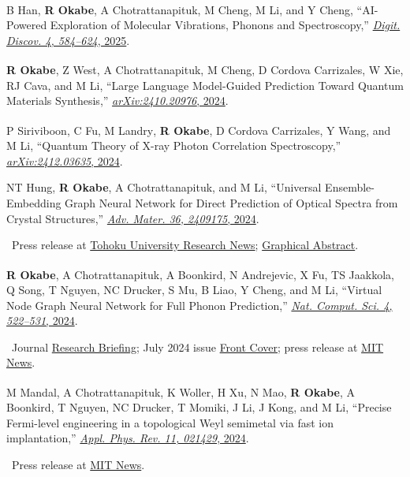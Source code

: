 \documentclass[10pt,a4paper]{article}
\newcommand{\note}[1]{\par{\hspace{1.2em}\textbullet\ #1}}
\newcommand{\cofirst}{\textsuperscript{\dag}}
\newcommand{\me}{\textbf{R Okabe}}
\begin{document}
\begin{cvenum}
  \item B Han\cofirst, \me\cofirst, A Chotrattanapituk\cofirst, M Cheng\cofirst, M Li, and Y Cheng, ``AI-Powered Exploration of Molecular Vibrations, Phonons and Spectroscopy,'' \href{https://doi.org/10.1039/D4DD00353E}{\textit{Digit. Discov. 4, 584--624}, 2025}.
  \item \me\cofirst, Z West\cofirst, A Chotrattanapituk, M Cheng, D Cordova Carrizales, W Xie, RJ Cava, and M Li, ``Large Language Model-Guided Prediction Toward Quantum Materials Synthesis,'' \href{https://arxiv.org/abs/2410.20976}{\textit{arXiv:2410.20976}, 2024}.
  \item P Siriviboon\cofirst, C Fu\cofirst, M Landry\cofirst, \me, D Cordova Carrizales, Y Wang, and M Li, ``Quantum Theory of X-ray Photon Correlation Spectroscopy,'' \href{https://arxiv.org/abs/2412.03635}{\textit{arXiv:2412.03635}, 2024}.
  \item NT Hung, \me, A Chotrattanapituk, and M Li, ``Universal Ensemble-Embedding Graph Neural Network for Direct Prediction of Optical Spectra from Crystal Structures,'' \href{https://doi.org/10.1002/adma.202409175}{\textit{Adv. Mater. 36, 2409175}, 2024}.
    \note{Press release at \href{https://www.tohoku.ac.jp/en/press/ai_speeds_up_discovery_of_energy_and_quantum_materials.html}{Tohoku University Research News}; \href{https://onlinelibrary.wiley.com/doi/10.1002/adma.202470369}{Graphical Abstract}.}
  \item \me\cofirst, A Chotrattanapituk\cofirst, A Boonkird, N Andrejevic, X Fu, TS Jaakkola, Q Song, T Nguyen, NC Drucker, S Mu, B Liao, Y Cheng, and M Li, ``Virtual Node Graph Neural Network for Full Phonon Prediction,'' \href{https://doi.org/10.1038/s43588-024-00661-0}{\textit{Nat. Comput. Sci. 4, 522--531}, 2024}.
    \note{Journal \href{https://www.nature.com/articles/s43588-024-00665-w}{Research Briefing}; July 2024 issue \href{https://www.nature.com/natcomputsci/volumes/4/issues/7}{Front Cover}; press release at \href{https://news.mit.edu/2024/ai-method-radically-speeds-predictions-materials-thermal-properties-0716}{MIT News}.}
  \item M Mandal\cofirst, A Chotrattanapituk\cofirst, K Woller, H Xu, N Mao, \me, A Boonkird, T Nguyen, NC Drucker, T Momiki, J Li, J Kong, and M Li, ``Precise Fermi-level engineering in a topological Weyl semimetal via fast ion implantation,'' \href{https://doi.org/10.1063/5.0181361}{\textit{Appl. Phys. Rev. 11, 021429}, 2024}.
    \note{Press release at \href{https://news.mit.edu/2024/new-approach-fine-tuning-quantum-materials-0812}{MIT News}.}

\end{cvenum}
\end{document}
